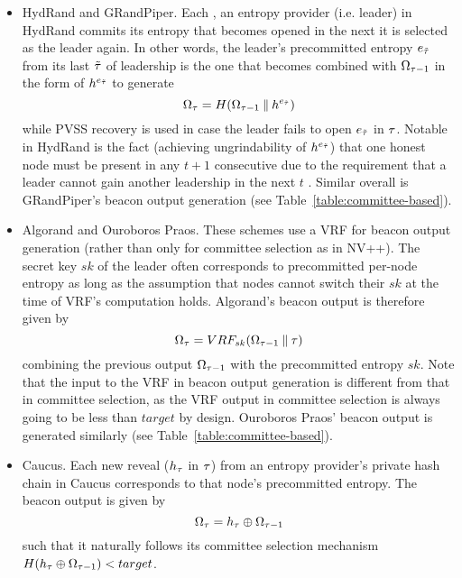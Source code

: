 \begin{itemize}
\item HydRand and GRandPiper. Each \epoch, an entropy provider (i.e. \epoch leader) in HydRand commits its entropy that becomes opened in the next \epoch it is selected as the leader again. In other words, the \epoch leader's precommitted entropy $e_{\tilde{\tau}}$ from its last \epoch $\tilde{\tau}$ of leadership is the one that becomes combined with $\Omega_{\tau - 1}$ in the form of $h^{e_{\tilde{\tau}}}$ to generate
\[
\Omega_\tau = H(\Omega_{\tau - 1} \mathbin\Vert h^{e_{\tilde{\tau}}})
\]
while PVSS recovery is used in case the leader fails to open $e_{\tilde{\tau}}$ in \epoch $\tau$. Notable in HydRand is the fact (achieving ungrindability of $h^{e_{\tilde{\tau}}}$) that one honest node must be present in any $t + 1$ consecutive \epochs due to the requirement that a leader cannot gain another leadership in the next $t$ \epochs. Similar overall is GRandPiper's beacon output generation (see Table~\ref{table:committee-based}).
\item Algorand and Ouroboros Praos. These schemes use a VRF for beacon output generation (rather than only for committee selection as in NV++). The secret key $sk$ of the \epoch leader often corresponds to precommitted per-node entropy as long as the assumption that nodes cannot switch their $sk$ at the time of VRF's computation holds. Algorand's beacon output is therefore given by
\[
\Omega_\tau = VRF_{sk}(\Omega_{\tau - 1} \mathbin\Vert \tau)
\]
combining the previous output $\Omega_{\tau - 1}$ with the precommitted entropy $sk$. Note that the input to the VRF in beacon output generation is different from that in committee selection, as the VRF output in committee selection is always going to be less than $target$ by design. Ouroboros Praos' beacon output is generated similarly (see Table~\ref{table:committee-based}).
\item Caucus. Each new reveal ($h_\tau$ in \epoch $\tau$) from an entropy provider's private hash chain in Caucus corresponds to that node's precommitted entropy. The beacon output is given by
\[
\Omega_\tau = h_\tau \oplus \Omega_{\tau - 1}
\]
such that it naturally follows its committee selection mechanism $H(h_\tau \oplus \Omega_{\tau - 1}) < target$.
\end{itemize}
